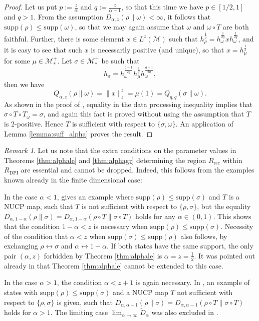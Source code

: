 \documentclass[12pt]{article}
\def\Me{\mathcal M}
\def\supp{\mathrm{supp}}
\theoremstyle{definition}
\theoremstyle{remark}
\newtheorem{remark}{Remark}
\begin{document}
\begin{proof} Let us put $p:=\frac{z}{\alpha}$ and $q:=\frac{z}{\alpha-1}$, so that this
time we have $p\in [1/2,1]$ and $q>1$.
From the assumption 
$D_{\alpha,z} (\rho\|\omega) < \infty$, it follows that $\supp(\rho) \le \supp(\omega)$,
so that we may again assume that $\omega$ and $\omega\circ T$ are both faithful.  Further,
there is some element $x\in L^z(\Me)$ such that
$h_\rho^\frac1p=h_\omega^{\frac1{2q}}xh_\omega^{\frac1{2q}}$, and it is easy to see that
such $x$ is necessarily positive (and unique), so that $x=h_\mu^{\frac1z}$ for some $\mu\in
\Me_*^+$. Let $\sigma\in \Me_*^+$ be such that
\[
h_\sigma=h_\omega^{\frac{q-1}{2q}}h_\mu^{\frac1q}h_\omega^{\frac{q-1}{2q}},
\]
then we have
\[
Q_{\alpha,z}(\rho\|\omega)=\|x\|_z^z=\mu(1)=Q_{q,q}(\sigma\|\omega).
\]
As shown in the proof of \cite[Thm.~4.7]{hiai2024alphaz}, equality in the data processing
inequality implies that $\sigma\circ T\circ T_\omega=\sigma$, and again this fact is
proved  without using the  assumption that $T$ is 2-positive. Hence $T$ is sufficient with
respect to $\{\sigma,\omega\}$. An application of Lemma \ref{lemma:suff_alpha} proves the
result.




\end{proof}

\begin{remark}\label{rem:region}  Let us note that the extra conditions on the parameter
values in Theorems \ref{thm:alphale} and \ref{thm:alphagr} determining the region
$R_{\text{rec}}$ within $R_{\text{DPI}}$ are essential and cannot be
dropped. Indeed, this follows from the examples known already in the finite dimensional
case:

In the case $\alpha<1$, \cite[Rem.~5.15]{hiai2017different} gives an example where 
$\supp(\rho)\le \supp(\sigma)$ and $T$ is a NUCP map, such that $T$ is not sufficient with
respect to $\{\rho,\sigma\}$, but the equality 
$D_{\alpha,1-\alpha}(\rho\|\sigma)=D_{\alpha,1-\alpha}(\rho\circ T\|\sigma\circ T)$ holds for any 
$\alpha\in (0,1)$. This shows that the condition $1-\alpha<z$ is necessary when
$\supp(\rho)\le \supp(\sigma)$. Necessity of the condition that $\alpha<z$ when $\supp(\sigma)\le
\supp(\rho)$ also follows, by exchanging $\rho\leftrightarrow\sigma$ and
$\alpha\leftrightarrow  1-\alpha$. If both states have the same support, the only
pair $(\alpha,z)$  forbidden by Theorem \ref{thm:alphale} is $\alpha=z=\frac12$. It was pointed out
already in
\cite[Appendix A.9]{mosonyi2015quantum} that Theorem \ref{thm:alphale} cannot be extended
to this case. 

In the case $\alpha>1$, the condition $\alpha< z+1$ is again necessary. In
\cite[Ex.~4.8]{hiai2017different}, an example of states with $\supp(\rho)\le
\supp(\sigma)$ and a NUCP map $T$ not sufficient with respect to $\{\rho,\sigma\}$ is given, such that 
$D_{\alpha,\alpha-1}(\rho\|\sigma)=D_{\alpha,\alpha-1}(\rho\circ T\|\sigma\circ T)$ holds for
$\alpha>1$. The limiting case $\lim_{\alpha\to \infty}\tilde D_\alpha$ was also excluded
in \cite[Appendix A.9]{mosonyi2015quantum}. 

\end{remark}




\printbibliography
\end{document}
